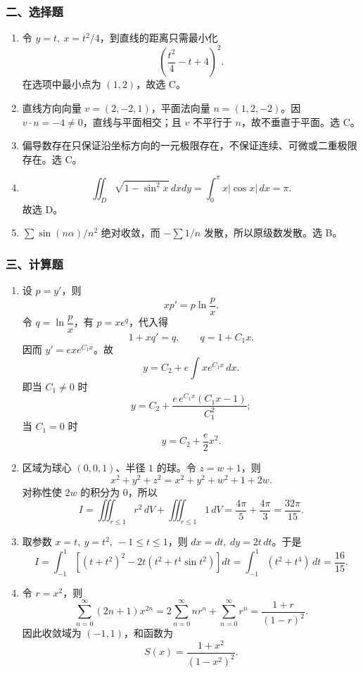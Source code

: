 \subsubsection*{二、选择题}
\begin{enumerate}
  \item 令 $y=t,\ x=t^2/4$，到直线的距离只需最小化
  \[
  \left(\frac{t^2}{4}-t+4\right)^2.
  \]
  在选项中最小点为 $(1,2)$，故选 C。
  \item 直线方向向量 $v=(2,-2,1)$，平面法向量 $n=(1,2,-2)$。因 $v\cdot n=-4\ne0$，直线与平面相交；且 $v$ 不平行于 $n$，故不垂直于平面。选 C。
  \item 偏导数存在只保证沿坐标方向的一元极限存在，不保证连续、可微或二重极限存在。选 C。
  \item
  \[
  \iint_D\sqrt{1-\sin^2x}\,dxdy
  =\int_0^\pi x|\cos x|\,dx=\pi.
  \]
  故选 D。
  \item $\sum\sin(n\alpha)/n^2$ 绝对收敛，而 $-\sum1/n$ 发散，所以原级数发散。选 B。
\end{enumerate}

\subsubsection*{三、计算题}
\begin{enumerate}
  \item 设 $p=y'$，则
  \[
  xp'=p\ln\frac{p}{x}.
  \]
  令 $q=\ln\dfrac{p}{x}$，有 $p=xe^q$，代入得
  \[
  1+xq'=q,\qquad q=1+C_1x.
  \]
  因而 $y'=ex e^{C_1x}$。故
  \[
  y=C_2+e\int x e^{C_1x}\,dx.
  \]
  即当 $C_1\ne0$ 时
  \[
  y=C_2+\frac{e\,e^{C_1x}(C_1x-1)}{C_1^2};
  \]
  当 $C_1=0$ 时
  \[
  y=C_2+\frac e2x^2.
  \]
  \item 区域为球心 $(0,0,1)$、半径 $1$ 的球。令 $z=w+1$，则
  \[
  x^2+y^2+z^2=x^2+y^2+w^2+1+2w.
  \]
  对称性使 $2w$ 的积分为 $0$，所以
  \[
  I=\iiint_{r\le1}r^2\,dV+\iiint_{r\le1}1\,dV
  =\frac{4\pi}{5}+\frac{4\pi}{3}
  =\frac{32\pi}{15}.
  \]
  \item 取参数 $x=t,\ y=t^2,\ -1\le t\le1$，则 $dx=dt,\ dy=2t\,dt$。于是
  \[
  I=\int_{-1}^{1}\left[(t+t^2)^2-2t(t^2+t^4\sin t^2)\right]dt
  =\int_{-1}^{1}(t^2+t^4)\,dt=\frac{16}{15}.
  \]
  \item 令 $r=x^2$，则
  \[
  \sum_{n=0}^{\infty}(2n+1)x^{2n}
  =2\sum_{n=0}^{\infty}nr^n+\sum_{n=0}^{\infty}r^n
  =\frac{1+r}{(1-r)^2}.
  \]
  因此收敛域为 $(-1,1)$，和函数为
  \[
  S(x)=\frac{1+x^2}{(1-x^2)^2}.
  \]
\end{enumerate}

